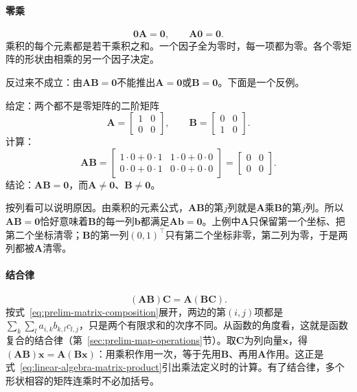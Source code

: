 \paragraph{零乘}
\[
 \bm0\bm A=\bm0,\qquad\bm A\bm0=\bm0.
\]
乘积的每个元素都是若干乘积之和。一个因子全为零时，每一项都为零。各个零矩阵的形状由相乘的另一个因子决定。

反过来不成立：由$\bm A\bm B=\bm0$不能推出$\bm A=\bm0$或$\bm B=\bm0$。下面是一个反例。
\begin{example}[反例：两个非零矩阵的乘积为零]
\label{ex:ls-zero-product-nonzero-factors}
给定：两个都不是零矩阵的二阶矩阵
\[
\bm A=\begin{bmatrix}1&0\\0&0\end{bmatrix},\qquad
\bm B=\begin{bmatrix}0&0\\1&0\end{bmatrix}.
\]
计算：
\[
 \bm A\bm B=\begin{bmatrix}1\cdot0+0\cdot1&1\cdot0+0\cdot0\\0\cdot0+0\cdot1&0\cdot0+0\cdot0\end{bmatrix}=\begin{bmatrix}0&0\\0&0\end{bmatrix}.
\]
结论：$\bm A\bm B=\bm0$，而$\bm A\neq\bm0$、$\bm B\neq\bm0$。
\end{example}
按列看可以说明原因。由乘积的元素公式，$\bm A\bm B$的第$j$列就是$\bm A$乘$\bm B$的第$j$列。所以$\bm A\bm B=\bm0$恰好意味着$\bm B$的每一列$\bm b$都满足$\bm A\bm b=\bm0$。上例中$\bm A$只保留第一个坐标、把第二个坐标清零；$\bm B$的第一列$(0,1)^\top$只有第二个坐标非零，第二列为零，于是两列都被$\bm A$清零。

\paragraph{结合律}
\[
 (\bm A\bm B)\bm C=\bm A(\bm B\bm C).
\]
按式~\eqref{eq:prelim-matrix-composition}展开，两边的第$(i,j)$项都是$\sum_k\sum_l a_{i,k}b_{k,l}c_{l,j}$，只是两个有限求和的次序不同。从函数的角度看，这就是函数复合的结合律（第~\ref{sec:prelim-map-operations}节）。取$\bm C$为列向量$\bm x$，得$(\bm A\bm B)\bm x=\bm A(\bm B\bm x)$：用乘积作用一次，等于先用$\bm B$、再用$\bm A$作用。这正是式~\eqref{eq:linear-algebra-matrix-product}引出乘法定义时的计算。有了结合律，多个形状相容的矩阵连乘时不必加括号。

